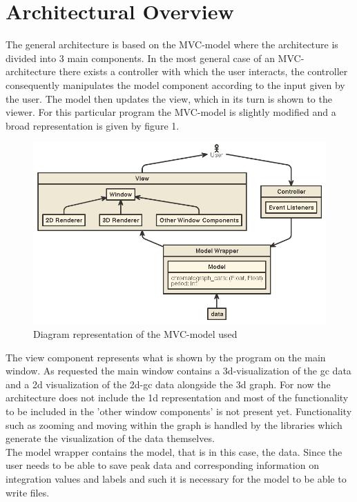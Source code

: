 \documentclass{article}
\begin{document}
\section*{Architectural Overview}
The general architecture is based on the MVC-model where the architecture is divided into 3 main components. In the most general case of an MVC-architecture there exists a controller with which the user interacts, the controller consequently manipulates the model component according to the input given by the user. The model then updates the view, which in its turn is shown to the viewer. For this particular program the MVC-model is slightly modified and a broad representation is given by figure 1.\\

\begin{figure}[h]
    \centering
    \includegraphics[scale=0.5]{nomnoml.png}
    \caption{Diagram representation of the MVC-model used}
    \label{fig:my_label}
\end{figure}
The view component represents what is shown by the program on the main window. As requested the main window contains a 3d-visualization of the gc data and a 2d visualization of the 2d-gc data alongside the 3d graph. For now the architecture does not include the 1d representation and most of the functionality to be included in the 'other window components' is not present yet. Functionality such as zooming and moving within the graph is handled by the libraries which generate the visualization of the data themselves. \\

The model wrapper contains the model, that is in this case, the data. Since the user needs to be able to save peak data and corresponding information on integration values and labels and such it is necessary for the model to be able to write files.\\
\end{document}
